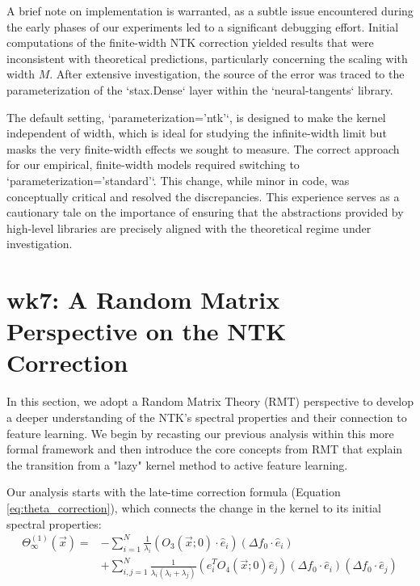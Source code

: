 \documentclass{article}
\begin{document}
A brief note on implementation is warranted, as a subtle issue encountered during the early phases of our experiments led to a significant debugging effort. Initial computations of the finite-width NTK correction yielded results that were inconsistent with theoretical predictions, particularly concerning the scaling with width $M$. After extensive investigation, the source of the error was traced to the parameterization of the `stax.Dense` layer within the `neural-tangents` library.

The default setting, `parameterization='ntk'`, is designed to make the kernel independent of width, which is ideal for studying the infinite-width limit but masks the very finite-width effects we sought to measure. The correct approach for our empirical, finite-width models required switching to `parameterization='standard'`. This change, while minor in code, was conceptually critical and resolved the discrepancies. This experience serves as a cautionary tale on the importance of ensuring that the abstractions provided by high-level libraries are precisely aligned with the theoretical regime under investigation.


\section{wk7: A Random Matrix Perspective on the NTK Correction}

In this section, we adopt a Random Matrix Theory (RMT) perspective to develop a deeper understanding of the NTK's spectral properties and their connection to feature learning. We begin by recasting our previous analysis within this more formal framework and then introduce the core concepts from RMT that explain the transition from a "lazy" kernel method to active feature learning.

Our analysis starts with the late-time correction formula (Equation \ref{eq:theta_correction}), which connects the change in the kernel to its initial spectral properties:
\begin{align*}
\Theta^{(1)}_\infty(\vec{x}) = & -\sum_{i=1}^N \frac{1}{\lambda_{i}}(O_{3}(\vec{x};0)\cdot\hat{e}_{i})(\Delta f_{0}\cdot\hat{e}_{i}) \\
& + \sum_{i,j=1}^N\frac{1}{\lambda_{i}(\lambda_{i}+\lambda_{j})}(\hat{e}_{i}^{T}O_{4}(\vec{x};0)\hat{e}_{j})(\Delta f_{0}\cdot \hat{e}_{i})(\Delta f_{0}\cdot \hat{e}_{j})
\end{align*}
\end{document}
